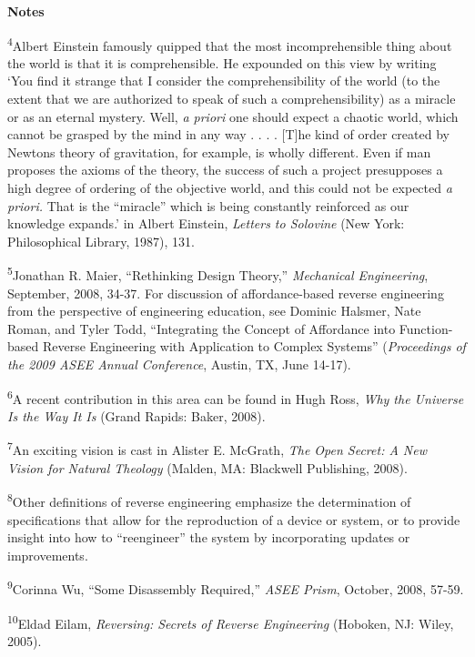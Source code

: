 \bigskip


\bigskip

\bfseries
Notes



\textsuperscript{4}Albert Einstein famously quipped that the most
incomprehensible thing about the world is that it is comprehensible. He
expounded on this view by writing ‘You find it strange that I consider
the comprehensibility of the world (to the extent that we are
authorized to speak of such a comprehensibility) as a miracle or as an
eternal mystery. Well, \textit{a priori} one should expect a chaotic
world, which cannot be grasped by the mind in any way . . . . [T]he
kind of order created by Newton{\textquotesingle}s theory of
gravitation, for example, is wholly different. Even if man proposes the
axioms of the theory, the success of such a project presupposes a high
degree of ordering of the objective world, and this could not be
expected \textit{a priori.} That is the
``miracle'' which is being constantly
reinforced as our knowledge expands.’ in Albert Einstein,
\textit{Letters to Solovine} (New York: Philosophical Library, 1987),
131. 


\textsuperscript{5}Jonathan R. Maier, “Rethinking Design Theory,”
\textit{Mechanical Engineering},\textit{ }September, 2008, 34-37. For
discussion of affordance-based reverse engineering from the perspective
of engineering education, see Dominic Halsmer, Nate Roman, and Tyler
Todd, “Integrating the Concept of Affordance into Function-based
Reverse Engineering with Application to Complex Systems”
(\textit{Proceedings of the 2009 ASEE Annual Conference}, Austin, TX,
June 14-17).


\textsuperscript{6}A recent contribution in this area can be found in
Hugh Ross, \textit{Why the Universe Is the Way It Is} (Grand Rapids:
Baker, 2008).


\textsuperscript{7}An exciting vision is cast in Alister E. McGrath,
\textit{The Open Secret: A New Vision for Natural Theology} (Malden,
MA: Blackwell Publishing, 2008).


\textsuperscript{8}Other definitions of reverse engineering emphasize
the determination of specifications that allow for the reproduction of
a device or system, or to provide insight into how to “reengineer” the
system by incorporating updates or improvements.


\textsuperscript{9}Corinna Wu, “Some Disassembly Required,” \textit{ASEE
Prism}, October, 2008, 57-59.


\textsuperscript{10}Eldad Eilam, \textit{Reversing: Secrets of Reverse
Engineering} (Hoboken, NJ: Wiley, 2005).


